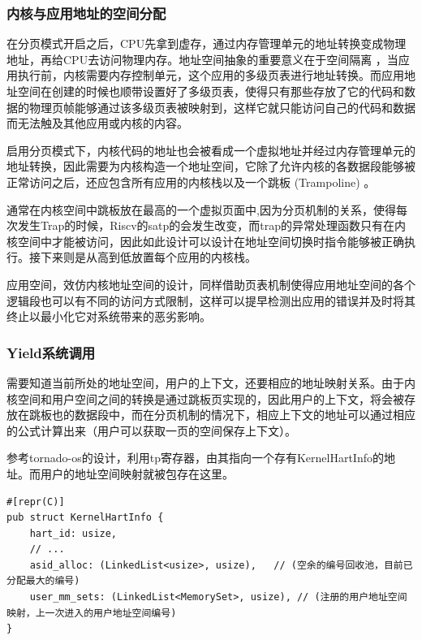 \subsubsection{内核与应用地址的空间分配}

在分页模式开启之后，CPU先拿到虚存，通过内存管理单元的地址转换变成物理地址，再给CPU去访问物理内存。地址空间抽象的重要意义在于空间隔离 ，当应用执行前，内核需要内存控制单元，这个应用的多级页表进行地址转换。而应用地址空间在创建的时候也顺带设置好了多级页表，使得只有那些存放了它的代码和数据的物理页帧能够通过该多级页表被映射到，这样它就只能访问自己的代码和数据而无法触及其他应用或内核的内容。

启用分页模式下，内核代码的地址也会被看成一个虚拟地址并经过内存管理单元的地址转换，因此需要为内核构造一个地址空间，它除了允许内核的各数据段能够被正常访问之后，还应包含所有应用的内核栈以及一个跳板 (Trampoline) 。

通常在内核空间中跳板放在最高的一个虚拟页面中,因为分页机制的关系，使得每次发生Trap的时候，Riscv的satp的会发生改变，而trap的异常处理函数只有在内核空间中才能被访问，因此如此设计可以设计在地址空间切换时指令能够被正确执行。接下来则是从高到低放置每个应用的内核栈。

应用空间，效仿内核地址空间的设计，同样借助页表机制使得应用地址空间的各个逻辑段也可以有不同的访问方式限制，这样可以提早检测出应用的错误并及时将其终止以最小化它对系统带来的恶劣影响。

\subsubsection{Yield系统调用}

需要知道当前所处的地址空间，用户的上下文，还要相应的地址映射关系。由于内核空间和用户空间之间的转换是通过跳板页实现的，因此用户的上下文，将会被存放在跳板也的数据段中，而在分页机制的情况下，相应上下文的地址可以通过相应的公式计算出来（用户可以获取一页的空间保存上下文）。

参考tornado-os的设计，利用tp寄存器，由其指向一个存有KernelHartInfo的地址。而用户的地址空间映射就被包存在这里。

\begin{lstlisting}[caption=KernelHartInfo的结构]
#[repr(C)]
pub struct KernelHartInfo {
    hart_id: usize,
    // ...
    asid_alloc: (LinkedList<usize>, usize),   // (空余的编号回收池，目前已分配最大的编号)
    user_mm_sets: (LinkedList<MemorySet>, usize), // (注册的用户地址空间映射，上一次进入的用户地址空间编号)
}
\end{lstlisting}


